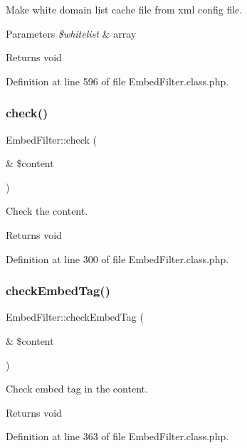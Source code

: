 Make white domain list cache file from xml config file. 
\begin{DoxyParams}{Parameters}
{\em \$whitelist} & array \\
\hline
\end{DoxyParams}
\begin{DoxyReturn}{Returns}
void 
\end{DoxyReturn}


Definition at line 596 of file Embed\+Filter.\+class.\+php.

\hypertarget{classEmbedFilter_ae494226c2201ff0c6c4c85ba429a16cf}{}\label{classEmbedFilter_ae494226c2201ff0c6c4c85ba429a16cf} 
\subsubsection{\texorpdfstring{check()}{check()}}
{\footnotesize\ttfamily Embed\+Filter\+::check (\begin{DoxyParamCaption}\item[{\&}]{\$content }\end{DoxyParamCaption})}

Check the content. \begin{DoxyReturn}{Returns}
void 
\end{DoxyReturn}


Definition at line 300 of file Embed\+Filter.\+class.\+php.

\hypertarget{classEmbedFilter_a6b0bba8c1ef91ae9afe7f26675216cb3}{}\label{classEmbedFilter_a6b0bba8c1ef91ae9afe7f26675216cb3} 
\subsubsection{\texorpdfstring{check\+Embed\+Tag()}{checkEmbedTag()}}
{\footnotesize\ttfamily Embed\+Filter\+::check\+Embed\+Tag (\begin{DoxyParamCaption}\item[{\&}]{\$content }\end{DoxyParamCaption})}

Check embed tag in the content. \begin{DoxyReturn}{Returns}
void 
\end{DoxyReturn}


Definition at line 363 of file Embed\+Filter.\+class.\+php.

